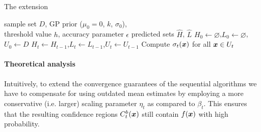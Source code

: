 \begin{algorithm}[tb]
  \caption{The \bacl extension}
  \label{alg:bacl}
\begin{algorithmic}[1]
  \REQUIRE sample set $D$, GP prior ($\mu_0 = 0$, $k$, $\sigma_0$),\\
           \hspace{1.6em}threshold value $h$, accuracy parameter $\epsilon$
  \ENSURE predicted sets $\hat{H}$, $\hat{L}$
  \STATE $H_0 \gets \varnothing$,\enskip $L_0 \gets \varnothing$,\enskip $U_0 \gets D$ \label{lin:binit1}
   \label{lin:binit2}
    \STATE $H_t \gets H_{t-1}$,\enskip $L_t \gets L_{t-1}$,\enskip $U_t \gets U_{t-1}$
       \label{lin:bupd}
       \label{lin:bclass1}
       \label{lin:bclassr2}
      \ENDIF \label{lin:bclass2}
    \ENDFOR
     \label{lin:sel1}
    \STATE Compute $\sigma_t(\bm{x})$ for all $\bm{x} \in U_t$
  \ENDWHILE
   \label{lin:bret1}
   \label{lin:bret2}
\end{algorithmic}
\end{algorithm}

\paragraph{Theoretical analysis}
Intuitively, to extend the convergence guarantees of the sequential algorithms
we have to compensate for using outdated mean estimates
by employing a more conservative
(i.e. larger) scaling parameter $\eta_t$ as compared to $\beta_t$.
This ensures that the resulting confidence regions $C_t^b(\bm{x})$
still contain $f(\bm{x})$ with high probability.

